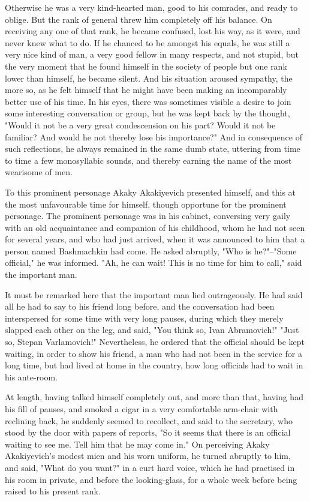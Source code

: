 Otherwise he was a very kind-hearted man, good to his comrades, and
ready to oblige. But the rank of general threw him completely off his
balance. On receiving any one of that rank, he became confused, lost
his way, as it were, and never knew what to do. If he chanced to be
amongst his equals, he was still a very nice kind of man, a very good
fellow in many respects, and not stupid, but the very moment that he
found himself in the society of people but one rank lower than
himself, he became silent. And his situation aroused sympathy, the
more so, as he felt himself that he might have been making an
incomparably better use of his time. In his eyes, there was sometimes
visible a desire to join some interesting conversation or group, but
he was kept back by the thought, "Would it not be a very great
condescension on his part? Would it not be familiar? And would he not
thereby lose his importance?" And in consequence of such reflections,
he always remained in the same dumb state, uttering from time to time
a few monosyllabic sounds, and thereby earning the name of the most
wearisome of men.

To this prominent personage Akaky Akakiyevich presented himself, and
this at the most unfavourable time for himself, though opportune for
the prominent personage. The prominent personage was in his cabinet,
conversing very gaily with an old acquaintance and companion of his
childhood, whom he had not seen for several years, and who had just
arrived, when it was announced to him that a person named Bashmachkin
had come. He asked abruptly, "Who is he?"--"Some official," he was
informed. "Ah, he can wait! This is no time for him to call," said the
important man.

It must be remarked here that the important man lied outrageously. He
had said all he had to say to his friend long before, and the
conversation had been interspersed for some time with very long
pauses, during which they merely slapped each other on the leg, and
said, "You think so, Ivan Abramovich!" "Just so, Stepan Varlamovich!"
Nevertheless, he ordered that the official should be kept waiting, in
order to show his friend, a man who had not been in the service for a
long time, but had lived at home in the country, how long officials
had to wait in his ante-room.

At length, having talked himself completely out, and more than that,
having had his fill of pauses, and smoked a cigar in a very
comfortable arm-chair with reclining back, he suddenly seemed to
recollect, and said to the secretary, who stood by the door with
papers of reports, "So it seems that there is an official waiting to
see me. Tell him that he may come in." On perceiving Akaky
Akakiyevich's modest mien and his worn uniform, he turned abruptly to
him, and said, "What do you want?" in a curt hard voice, which he had
practised in his room in private, and before the looking-glass, for a
whole week before being raised to his present rank.

